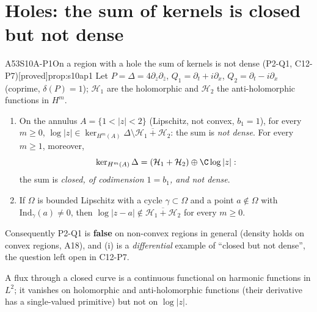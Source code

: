 \documentclass[11pt,a4paper,oneside]{report}
\newcommand{\badge}[2]{\textcolor{#1}{\textsf{\footnotesize[#2]}}}
\newcommand{\proved}{\badge{cC}{proved}}
\newenvironment{dimcard}[5]{\par\Needspace{12\baselineskip}\begin{dimcardbox}{#1}{#2}{#3}{#4}{#5}}{\end{dimcardbox}}
\begin{document}
\section{Holes: the sum of kernels is closed but not dense}

\begin{dimcard}{A53}{S10A-P1}{On a region with a hole the sum of kernels is not dense (P2-Q1, C12-P7)}{\proved}{prop:s10ap1}
Let $P=\Delta=4\partial_z\partial_{\bar z}$, $Q_1=\partial_t+i\partial_x$, $Q_2=\partial_t-i\partial_x$ (coprime, $\delta(P)=1$); $\mathcal H_1$ are the holomorphic and $\mathcal H_2$ the anti-holomorphic functions in $H^m$.
\begin{enumerate}[label=(\roman*)]
\item On the annulus $A=\{1<|z|<2\}$ (Lipschitz, not convex, $b_1=1$), for every $m\ge0$, $\log|z|\in\ker_{H^m(A)}\Delta\setminus\overline{\mathcal H_1+\mathcal H_2}$: the sum is \emph{not dense}. For every $m\ge1$, moreover,
\[
\ker_{H^m(A)}\Delta=(\mathcal H_1+\mathcal H_2)\oplus\C\log|z| :
\]
the sum is \emph{closed, of codimension $1=b_1$, and not dense}.
\item If $\Omega$ is bounded Lipschitz with a cycle $\gamma\subset\Omega$ and a point $a\notin\Omega$ with $\mathrm{Ind}_\gamma(a)\ne0$, then $\log|z-a|\notin\overline{\mathcal H_1+\mathcal H_2}$ for every $m\ge0$.
\end{enumerate}
Consequently P2-Q1 is \textbf{false} on non-convex regions in general (density holds on convex regions, A18), and (i) is a \emph{differential} example of ``closed but not dense'', the question left open in C12-P7.
\end{dimcard}

\begin{proofidea}
A flux through a closed curve is a continuous functional on harmonic functions in $L^2$; it vanishes on holomorphic and anti-holomorphic functions (their derivative has a single-valued primitive) but not on $\log|z|$.
\end{proofidea}
\end{document}
